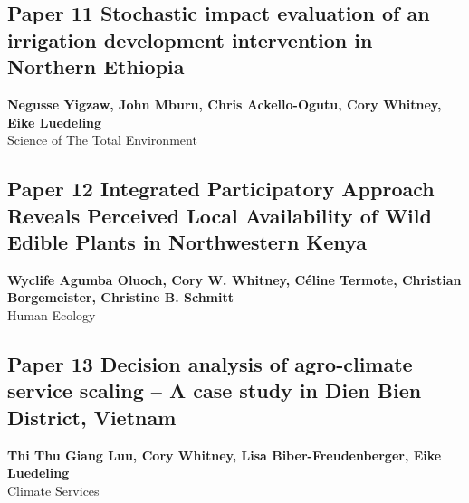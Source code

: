 \documentclass[
]{article}
\begin{document}
\newpage

\hypertarget{yigzaw_stochastic_2019}{%
\subsection{Paper 11 Stochastic impact evaluation of an irrigation
development intervention in Northern
Ethiopia}\label{yigzaw_stochastic_2019}}

\begin{center}
\vspace*{2cm}
{\Large \textbf{Negusse Yigzaw, John Mburu, Chris Ackello-Ogutu, Cory Whitney, Eike Luedeling}} \\[0.5cm]
\vspace*{1cm}
{\Large Science of The Total Environment} \\[2cm]
\end{center}


\newpage

\hypertarget{oluoch_integrated_2022}{%
\subsection{Paper 12 Integrated Participatory Approach Reveals Perceived
Local Availability of Wild Edible Plants in Northwestern
Kenya}\label{oluoch_integrated_2022}}

\begin{center}
\vspace*{2cm}
{\Large \textbf{Wyclife Agumba Oluoch, Cory W. Whitney, Céline Termote, Christian Borgemeister, Christine B. Schmitt}} \\[0.5cm]
\vspace*{1cm}
{\Large Human Ecology} \\[2cm]
\end{center}


\newpage

\hypertarget{luu_decision_2022}{%
\subsection{Paper 13 Decision analysis of agro-climate service scaling
-- A case study in Dien Bien District,
Vietnam}\label{luu_decision_2022}}

\begin{center}
\vspace*{2cm}
{\Large \textbf{Thi Thu Giang Luu, Cory Whitney, Lisa Biber-Freudenberger, Eike Luedeling}} \\[0.5cm]
\vspace*{1cm}
{\Large Climate Services} \\[2cm]
\end{center}

\end{document}
